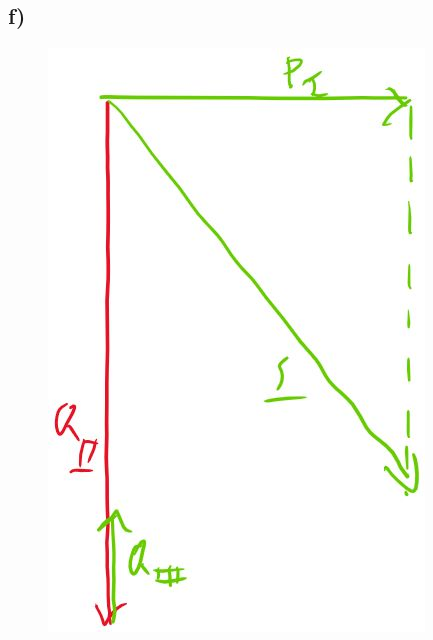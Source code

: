 \documentclass[../../document.tex]{subfiles}
\begin{document}
\subsection*{f)}

\begin{figure}[H]
    \begin{center}
        \includegraphics[width=.9\linewidth]{../../img/task1-f.jpeg}
    \end{center}
\end{figure}
\end{document}
